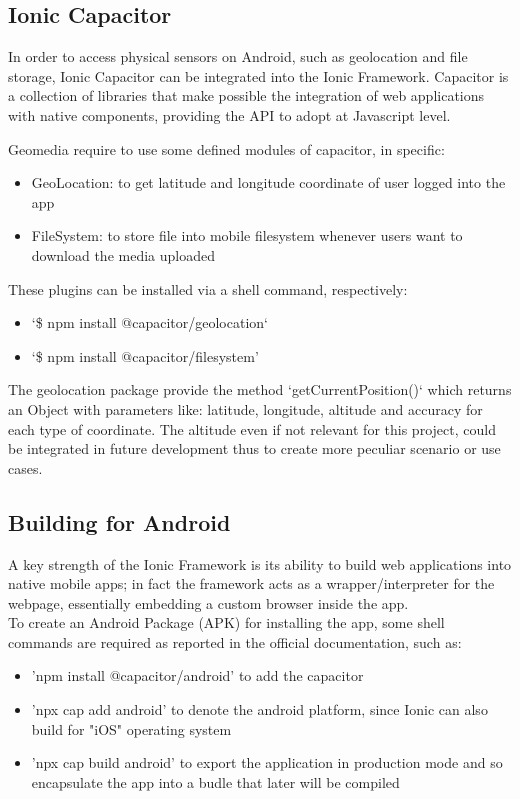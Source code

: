 \documentclass[conference]{IEEEtran}
\begin{document}
\subsection{Ionic Capacitor}

In order to access physical sensors on Android, such as geolocation and file storage, Ionic Capacitor can be integrated into the Ionic Framework. Capacitor is a collection of libraries that make possible the integration of web applications with native components, providing the API to adopt at Javascript level.

Geomedia require to use some defined modules of capacitor, in specific:
\begin{itemize}
    \item GeoLocation: to get latitude and longitude coordinate of user logged into the app
    \item FileSystem: to store file into mobile filesystem whenever users want to download the media uploaded
\end{itemize}

These plugins can be installed via a shell command, respectively:
\begin{itemize}
    \item `\$ npm install @capacitor/geolocation`
    \item `\$ npm install @capacitor/filesystem'
\end{itemize}

The geolocation package provide the method `getCurrentPosition()` which returns an Object with parameters like: latitude, longitude, altitude and accuracy for each type of coordinate. The altitude even if not relevant for this project, could be integrated in future development thus to create more peculiar scenario or use cases.


\subsection{Building for Android}

A key strength of the Ionic Framework is its ability to build web applications into native mobile apps; in fact the framework acts as a wrapper/interpreter for the webpage, essentially embedding a custom browser inside the app.
\\
To create an Android Package (APK) for installing the app, some shell commands are required as reported in the official documentation, such as:
\begin{itemize}
    \item 'npm install @capacitor/android' to add the capacitor
    \item  'npx cap add android' to denote the android platform, since Ionic can also build for "iOS" operating system
    \item 'npx cap build android' to export the application in production mode and so encapsulate the app into a budle that later will be compiled
\end{itemize}
\end{document}
